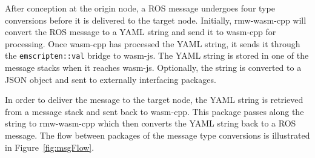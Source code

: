     After conception at the origin node, a \ac{ROS} message undergoes four type conversions before it is delivered to the target node. Initially, \textsf{rmw-wasm-cpp} will convert the \ac{ROS} message to a \ac{YAML} string and send it to \textsf{wasm-cpp} for processing. Once \textsf{wasm-cpp} has processed the \ac{YAML} string, it sends it through the \texttt{emscripten::val} bridge to \textsf{wasm-js}. The \ac{YAML} string is stored in one of the message stacks when it reaches \textsf{wasm-js}. Optionally, the string is converted to a \ac{JSON} object and sent to externally interfacing packages. 

    In order to deliver the message to the target node, the \ac{YAML} string is retrieved from a message stack and sent back to \textsf{wasm-cpp}. This package passes along the string to \textsf{rmw-wasm-cpp} which then converts the \ac{YAML} string back to a \ac{ROS} message. The flow between packages of the message type conversions is illustrated in Figure~\ref{fig:msgFlow}.

